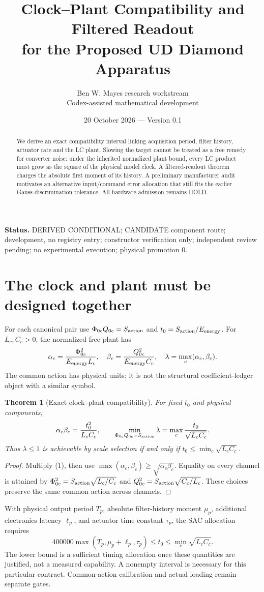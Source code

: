 \documentclass[10pt,a4paper]{article}
\title{Clock--Plant Compatibility and Filtered Readout\\for the Proposed UD Diamond Apparatus}
\author{Ben W. Mayes research workstream\\Codex-assisted mathematical development}
\date{20 October 2026 --- Version 0.1}
\newtheorem{theorem}{Theorem}
\begin{document}
\maketitle
\begin{abstract}
We derive an exact compatibility interval linking acquisition period, filter history, actuator rate and the LC plant. Slowing the target cannot be treated as a free remedy for converter noise: under the inherited normalized plant bound, every LC product must grow as the square of the physical model clock. A filtered-readout theorem charges the absolute first moment of its history. A preliminary manufacturer audit motivates an alternative input/command error allocation that still fits the earlier Gauss-discrimination tolerance. All hardware admission remains HOLD.
\end{abstract}
\noindent\textbf{Status.} DERIVED CONDITIONAL; CANDIDATE component route; development, no registry entry; constructor verification only; independent review pending; no experimental execution; physical promotion 0.
\section{The clock and plant must be designed together}
For each canonical pair use $\Phi_{0c}Q_{0c}=S_{\rm action}$ and
$t_0=S_{\rm action}/E_{\rm energy}$. For $L_c,C_c>0$, the normalized free plant has
\begin{equation}
\alpha_c=\frac{\Phi_{0c}^2}{E_{\rm energy}L_c},\quad
\beta_c=\frac{Q_{0c}^2}{E_{\rm energy}C_c},\quad
\lambda=\max_c(\alpha_c,\beta_c).
\end{equation}
The common action has physical units; it is not the structural coefficient-ledger object with a similar symbol.
\begin{theorem}[Exact clock--plant compatibility]
For fixed $t_0$ and physical components,
\begin{equation}
\alpha_c\beta_c=\frac{t_0^2}{L_cC_c},\qquad
\min_{\Phi_{0c}Q_{0c}=S_{\rm action}}\lambda
=\max_c\frac{t_0}{\sqrt{L_cC_c}} .
\end{equation}
Thus $\lambda\leq1$ is achievable by scale selection if and only if
$t_0\leq\min_c\sqrt{L_cC_c}$.
\end{theorem}
\begin{proof}
Multiply (1), then use $\max(\alpha_c,\beta_c)\geq\sqrt{\alpha_c\beta_c}$.
Equality on every channel is attained by
$\Phi_{0c}^2=S_{\rm action}\sqrt{L_c/C_c}$ and
$Q_{0c}^2=S_{\rm action}\sqrt{C_c/L_c}$.
These choices preserve the same common action across channels.
\end{proof}
With physical output period $T_p$, absolute filter-history moment $\mu_p$, additional electronics latency $\ell_p$, and actuator time constant $\tau_p$, the SAC allocation requires
\begin{equation}
400000\max(T_p,\mu_p+\ell_p,\tau_p)
\leq t_0\leq\min_c\sqrt{L_cC_c}.
\end{equation}
The lower bound is a sufficient timing allocation once these quantities are justified, not a measured capability. A nonempty interval is necessary for this particular contract. Common-action calibration and actual loading remain separate gates.
\newpage
\end{document}
